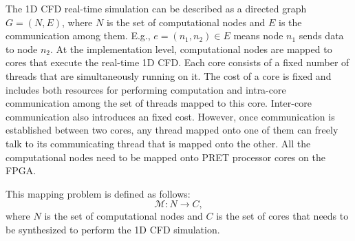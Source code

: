 The 1D CFD real-time simulation can be described as a directed graph $G=(N,E)$, where $N$ is the set of computational nodes and $E$ is the communication among them. E.g., $e = (n_1, n_2) \in E$ means node $n_1$ sends data to node $n_2$. 
%
At the implementation level, computational nodes are mapped to cores that execute the real-time 1D CFD. 
Each core consists of a fixed number of threads that are simultaneously running on it. 
The cost of a core is fixed and includes both resources for performing computation and intra-core communication among the set of threads mapped to this core. 
Inter-core communication also introduces an fixed cost. However, once communication is established between two cores, any thread mapped onto one of them can freely talk to its communicating thread that is mapped onto the other. 
All the computational nodes need to be mapped onto PRET processor cores on the FPGA. 

This mapping problem is defined as follows:
%
\begin{equation*} \label{eq:DG}
\mathcal{M}: N \rightarrow C,
\end{equation*}
%
where $N$ is the set of computational nodes and $C$ is the set of cores that needs to be synthesized to perform the 1D CFD simulation. 

